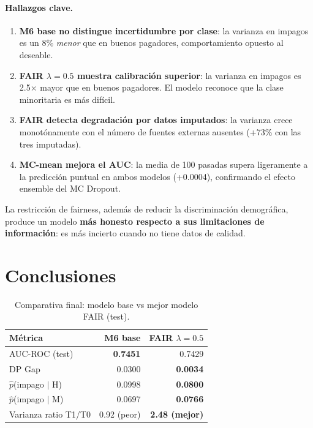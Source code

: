 \documentclass[12pt,a4paper]{article}
\begin{document}
\paragraph{Hallazgos clave.}
\begin{enumerate}
    \item \textbf{M6 base no distingue incertidumbre por clase}: la varianza
          en impagos es un 8\% \emph{menor} que en buenos pagadores,
          comportamiento opuesto al deseable.
    \item \textbf{FAIR $\lambda=0.5$ muestra calibración superior}: la
          varianza en impagos es 2.5× mayor que en buenos pagadores. El
          modelo reconoce que la clase minoritaria es más difícil.
    \item \textbf{FAIR detecta degradación por datos imputados}: la varianza
          crece monotónamente con el número de fuentes externas ausentes
          (+73\% con las tres imputadas).
    \item \textbf{MC-mean mejora el AUC}: la media de 100 pasadas supera
          ligeramente a la predicción puntual en ambos modelos (+0.0004),
          confirmando el efecto ensemble del MC Dropout.
\end{enumerate}

La restricción de fairness, además de reducir la discriminación demográfica,
produce un modelo \textbf{más honesto respecto a sus limitaciones de
información}: es más incierto cuando no tiene datos de calidad.

\section{Conclusiones}
\label{sec:conclusions}

\begin{table}[H]
\centering
\caption{Comparativa final: modelo base vs mejor modelo FAIR (test).}
\label{tab:final}
\begin{tabular}{@{}lrr@{}}
\toprule
\textbf{Métrica} & \textbf{M6 base} & \textbf{FAIR $\lambda=0.5$} \\
\midrule
AUC-ROC (test)     & \textbf{0.7451} & 0.7429 \\
DP Gap             & 0.0300          & \textbf{0.0034} \\
$\hat{p}$(impago $|$ H) & 0.0998    & \textbf{0.0800} \\
$\hat{p}$(impago $|$ M) & 0.0697    & \textbf{0.0766} \\
Varianza ratio T1/T0 & 0.92 (peor) & \textbf{2.48 (mejor)} \\
\bottomrule
\end{tabular}
\end{table}
\end{document}
